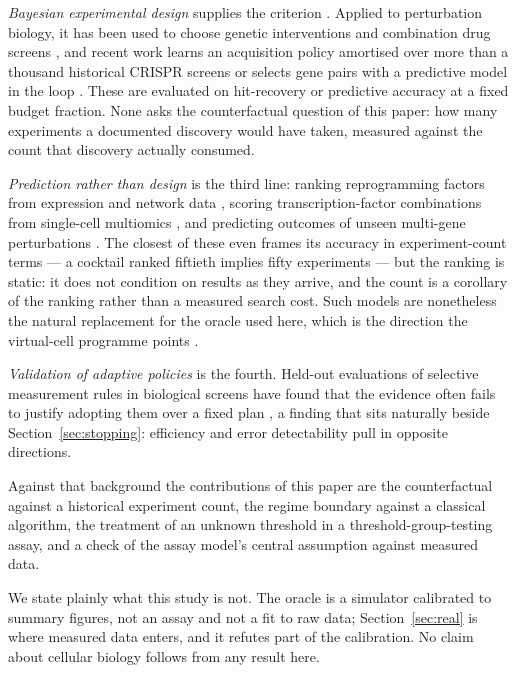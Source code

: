 \documentclass[11pt]{article}
\begin{document}
\emph{Bayesian experimental design} supplies the criterion
\citep{lindley1956, chaloner1995, rainforth2024}. Applied to perturbation
biology, it has been used to choose genetic interventions \citep{zhang2023} and
combination drug screens \citep{tosh2025}, and recent work learns an acquisition
policy amortised over more than a thousand historical CRISPR screens
\citep{edwards2026} or selects gene pairs with a predictive model in the loop
\citep{qin2025}. These are evaluated on hit-recovery or predictive accuracy at a
fixed budget fraction. None asks the counterfactual question of this paper: how
many experiments a documented discovery would have taken, measured against the
count that discovery actually consumed.

\emph{Prediction rather than design} is the third line: ranking reprogramming
factors from expression and network data \citep{rackham2016}, scoring
transcription-factor combinations from single-cell multiomics
\citep{tfcomb2025}, and predicting outcomes of unseen multi-gene perturbations
\citep{roohani2022}. The closest of these even frames its accuracy in
experiment-count terms --- a cocktail ranked fiftieth implies fifty experiments
--- but the ranking is static: it does not condition on results as they arrive,
and the count is a corollary of the ranking rather than a measured search cost.
Such models are nonetheless the natural replacement for the oracle used here,
which is the direction the virtual-cell programme points \citep{bunne2024}.

\emph{Validation of adaptive policies} is the fourth. Held-out evaluations of
selective measurement rules in biological screens have found that the evidence
often fails to justify adopting them over a fixed plan \citep{bi2026}, a
finding that sits naturally beside Section~\ref{sec:stopping}: efficiency and
error detectability pull in opposite directions.

Against that background the contributions of this paper are the counterfactual
against a historical experiment count, the regime boundary against a classical
algorithm, the treatment of an unknown threshold in a threshold-group-testing
assay, and a check of the assay model's central assumption against measured
data.

We state plainly what this study is not. The oracle is a simulator calibrated to
summary figures, not an assay and not a fit to raw data; Section~\ref{sec:real}
is where measured data enters, and it refutes part of the calibration. No claim
about cellular biology follows from any result here.
\end{document}
